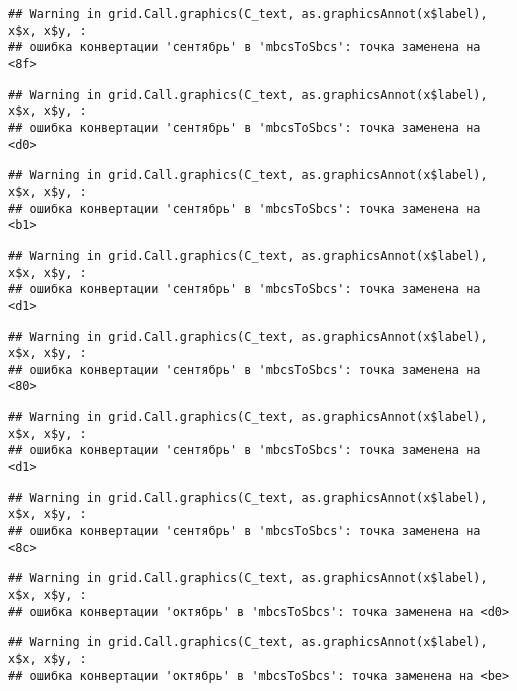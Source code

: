 \documentclass[
]{article}
\begin{document}
\begin{verbatim}
## Warning in grid.Call.graphics(C_text, as.graphicsAnnot(x$label), x$x, x$y, :
## ошибка конвертации 'сентябрь' в 'mbcsToSbcs': точка заменена на <8f>
\end{verbatim}

\begin{verbatim}
## Warning in grid.Call.graphics(C_text, as.graphicsAnnot(x$label), x$x, x$y, :
## ошибка конвертации 'сентябрь' в 'mbcsToSbcs': точка заменена на <d0>
\end{verbatim}

\begin{verbatim}
## Warning in grid.Call.graphics(C_text, as.graphicsAnnot(x$label), x$x, x$y, :
## ошибка конвертации 'сентябрь' в 'mbcsToSbcs': точка заменена на <b1>
\end{verbatim}

\begin{verbatim}
## Warning in grid.Call.graphics(C_text, as.graphicsAnnot(x$label), x$x, x$y, :
## ошибка конвертации 'сентябрь' в 'mbcsToSbcs': точка заменена на <d1>
\end{verbatim}

\begin{verbatim}
## Warning in grid.Call.graphics(C_text, as.graphicsAnnot(x$label), x$x, x$y, :
## ошибка конвертации 'сентябрь' в 'mbcsToSbcs': точка заменена на <80>
\end{verbatim}

\begin{verbatim}
## Warning in grid.Call.graphics(C_text, as.graphicsAnnot(x$label), x$x, x$y, :
## ошибка конвертации 'сентябрь' в 'mbcsToSbcs': точка заменена на <d1>
\end{verbatim}

\begin{verbatim}
## Warning in grid.Call.graphics(C_text, as.graphicsAnnot(x$label), x$x, x$y, :
## ошибка конвертации 'сентябрь' в 'mbcsToSbcs': точка заменена на <8c>
\end{verbatim}

\begin{verbatim}
## Warning in grid.Call.graphics(C_text, as.graphicsAnnot(x$label), x$x, x$y, :
## ошибка конвертации 'октябрь' в 'mbcsToSbcs': точка заменена на <d0>
\end{verbatim}

\begin{verbatim}
## Warning in grid.Call.graphics(C_text, as.graphicsAnnot(x$label), x$x, x$y, :
## ошибка конвертации 'октябрь' в 'mbcsToSbcs': точка заменена на <be>
\end{verbatim}
\end{document}
